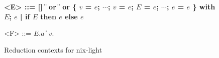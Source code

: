 \begin{figure}
  \begin{grammar}
    \bfseries
    <E> ::= [] \|  
    \alt {} \|  or  \|  \|  or 
    \alt \{ $v$ = $e$; $\cdots{}$; $v$ = $e$; $E$ = $e$; $\cdots{}$; $e$ = $e$ \}
    \alt with $E$; $e$ | if $E$ then $e$ else $e$

    <F> ::= $E$.$a$ \| $v$.
  \end{grammar}
  \caption{Reduction contexts for nix-light\label{fig:semantics:nix-light:reduction-contexts}}
\end{figure}
